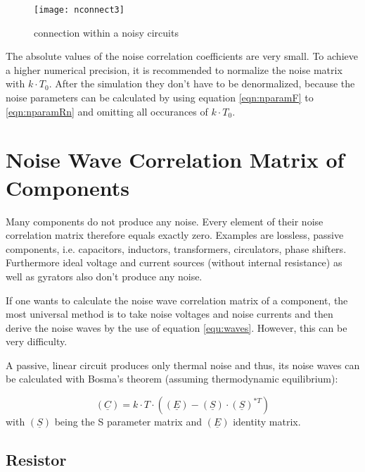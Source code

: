 \documentclass[10pt]{report}
\begin{document}
\begin{figure}[ht]
\begin{center}
\texttt{[image: nconnect3]}
\end{center}
\caption{connection within a noisy circuits}
\label{fig:nconnect3}
\end{figure}
\FloatBarrier

The absolute values of the noise correlation coefficients are very small.
To achieve a higher numerical precision, it is recommended to normalize
the noise matrix with $k\cdot T_0$. After the simulation they don't have
to be denormalized, because the noise parameters can be calculated by using
equation \ref{eqn:nparamF} to \ref{eqn:nparamRn} and omitting all
occurances of $k\cdot T_0$.


\section{Noise Wave Correlation Matrix of Components}

Many components do not produce any noise. Every element of their noise
correlation matrix therefore equals exactly zero. Examples are
lossless, passive components, i.e. capacitors, inductors,
transformers, circulators, phase shifters. Furthermore ideal voltage
and current sources (without internal resistance) as well as gyrators
also don't produce any noise.

\addvspace{12pt}

If one wants to calculate the noise wave correlation matrix of a
component, the most universal method is to take noise voltages and
noise currents and then derive the noise waves by the use of equation
\ref{equ:waves}. However, this can be very difficulty.

\addvspace{12pt}

A passive, linear circuit produces only thermal noise and thus, its
noise waves can be calculated with Bosma's theorem (assuming
thermodynamic equilibrium):

\begin{equation}
(\underline{C}) = k\cdot T\cdot \left( (\underline{E}) - (\underline{S})\cdot(\underline{S})^{*T} \right)
\end{equation}
with $(\underline{S})$ being the S parameter matrix and $(\underline{E})$ identity matrix.


\subsection{Resistor}
\end{document}
